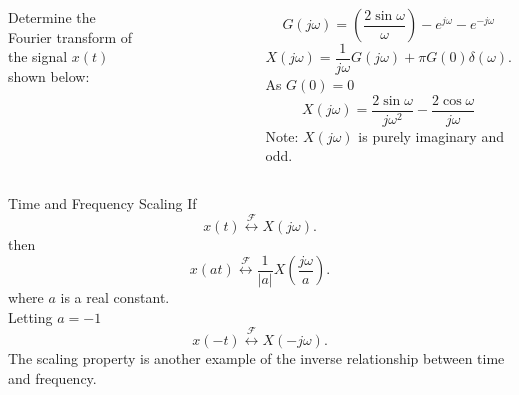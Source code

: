 \begin{frame}[plain]
    \begin{columns}
        \begin{example}
            Determine the Fourier transform of the signal $x(t)$ shown below:
            \begin{figure}
            \centering
                
            \end{figure}
        \end{example}
        \pause

        {
            \begin{figure}
            \centering
                
            \end{figure}
        }
        \pause
        {
            \begin{equation*}
                G(j\omega) = \left(\frac{2\sin \omega}{\omega}\right) - e^{j\omega} - e^{-j\omega}
            \end{equation*}
            \pause
            \begin{equation*}
                X(j\omega) = \frac{1}{ j\omega} G(j\omega) + \pi G(0)\delta(\omega).
            \end{equation*}
            As $G(0) = 0$\\
            \pause
            \begin{equation*}
                X(j\omega) = \frac{2\sin \omega}{ j\omega^2}  - \frac{2\cos \omega}{j\omega}
            \end{equation*}
            Note: $ X(j\omega)$ is purely imaginary and odd.
        }
    \end{columns}
\end{frame}


\begin{frame}{Time and Frequency Scaling}
    If
    \begin{equation*}
        x(t)  \overset{\mathcal{F}}{\longleftrightarrow}  X(j\omega).
    \end{equation*}
    then
    \begin{equation*}
        x(at)  \overset{\mathcal{F}}{\longleftrightarrow}  \frac{1}{|a|}X\left(\frac{j\omega}{a}\right).
    \end{equation*}
    where $a$ is a real constant.\pause \\
    Letting $a = -1$\pause
    \begin{equation*}
        x(-t)  \overset{\mathcal{F}}{\longleftrightarrow}  X(-j\omega).
    \end{equation*}
    The scaling property is another example of the inverse relationship between time and frequency.
\end{frame}

